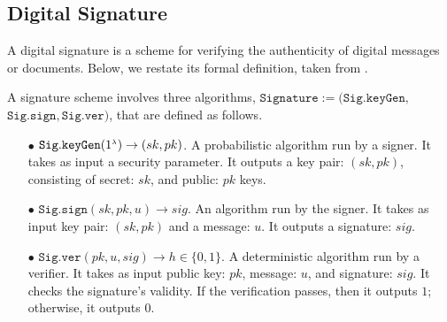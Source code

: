













\subsection{Digital Signature}\label{subsec:DS}

A digital signature is a scheme for verifying the authenticity of digital messages or documents. Below, we restate its formal definition, taken from \cite{DBLP:books/crc/KatzLindell2014}. 


\begin{definition}\label{sec::def}
A signature scheme  involves three algorithms, $\mathtt{Signature}:=(\mathtt{Sig.keyGen}, $ $\mathtt{Sig.sign}, \mathtt{Sig.ver})$, that are defined as follows.

\begin{itemize} 
\item[$\bullet$] $\mathtt{Sig.keyGen}(1^{\scriptscriptstyle \lambda})\rightarrow (sk,pk)$.  A probabilistic algorithm run by  a  signer. It takes as input a security parameter. It outputs a key pair: $(sk,pk)$, consisting of secret: $sk$, and public: $pk$ keys. 
\item[$\bullet$] $\mathtt{Sig.sign}(sk, pk, u)\rightarrow sig$. An algorithm run by the signer. It takes as input  key pair: $(sk,pk)$ and a message: $u$. It outputs a signature: $sig$.
\item[$\bullet$]  $\mathtt{Sig.ver}( pk, u, sig)\rightarrow h\in\{0,1\}$. A deterministic algorithm run by a verifier. It takes as input  public key: $pk$,  message: $u$, and signature: $sig$. It checks the signature's validity.   If the verification passes, then it outputs $1$; otherwise, it outputs $0$. 
\end{itemize}
\end{definition}

